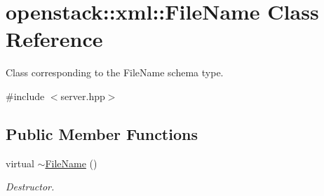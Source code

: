 \hypertarget{classopenstack_1_1xml_1_1FileName}{
\section{openstack::xml::FileName Class Reference}
\label{classopenstack_1_1xml_1_1FileName}
}


Class corresponding to the FileName schema type.  




{\ttfamily \#include $<$server.hpp$>$}

\subsection*{Public Member Functions}
\begin{DoxyCompactItemize}
\item 
\hypertarget{classopenstack_1_1xml_1_1FileName_adaed61b49dbbfe6efccf76739bd607e7}{
virtual \hyperlink{classopenstack_1_1xml_1_1FileName_adaed61b49dbbfe6efccf76739bd607e7}{$\sim$FileName} ()}
\label{classopenstack_1_1xml_1_1FileName_adaed61b49dbbfe6efccf76739bd607e7}

\begin{DoxyCompactList}\small\item\em Destructor. \item\end{DoxyCompactList}\end{DoxyCompactItemize}
